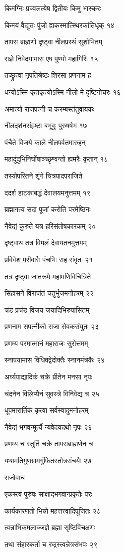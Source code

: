 किमग्निः प्रज्वलत्येष द्वितीयः किमु भास्करः

किमयं वैद्युतः पुंजो ह्यकस्मात्स्थिरकांतिधृक् १४

तापस ब्राह्मणो दृष्ट्वा नीलप्रस्थं सुशोभितम्

राज्ञे निवेदयामास एष पुण्यो महागिरिः १५

तच्छ्रुत्वा नृपतिश्रेष्ठः शिरसा प्रणनाम ह

धन्योऽस्मि कृतकृत्योऽस्मि नीलो मे दृष्टिगोचरः १६

अमात्यो राजपत्नी च करम्बस्तंतुवायकः

नीलदर्शनसंहृष्टा बभूवुः पुरुषर्षभ १७

पंचैते विजये काले नीलपर्वतमारुहन्

महादुंदुभिनिर्घोषाञ्च्छृण्वन्तो ह्यमरैः कृतान् १८

तस्योपरितने शृंगे चित्रपादपराजिते

ददर्श हाटकाबद्धं देवालयमनुत्तमम् १९

ब्रह्मागत्य सदा पूजां करोति परमेष्ठिनः

नैवेद्यं कुरुते यत्र हरिसंतोषकारकम् २०

दृष्ट्वाथ तत्र विमलं देवायतनमुत्तमम्

प्रविवेश परीवारैः पंचभिः सह संवृतः २१

तत्र दृष्ट्वा जातरूपे महामणिविचित्रिते

सिंहासने विराजंतं चतुर्भुजमनोहरम् २२

चंड प्रचंड विजय जयादिभिरुपासितम्

प्रणनाम सपत्नीको राजा सेवकसंयुतः २३

प्रणम्य परमात्मानं महाराजः सुरोत्तमम्

स्नापयामास विधिवद्वेदोक्तैः स्नानमंत्रकैः २४

अर्घ्यपाद्यादिकं चक्रे प्रीतेन मनसा नृपः

चंदनेन विलिप्यैनं सुवस्त्रे विनिवेद्य च २५

धूपमारार्तिकं कृत्वा सर्वस्वादुमनोहरम्

नैवेद्यं भगवन्मूर्त्यै न्यवेदयदथो नृपः २६

प्रणम्य च स्तुतिं चक्रे तापसब्राह्मणेन च

यथामतिगुणग्रामगुंफितस्तोत्रसंचयैः २७

राजोवाच

एकस्त्वं पुरुषः साक्षाद्भगवान्प्रकृतेः परः

कार्यकारणतो भिन्नो महत्तत्त्वादिपूजितः २८

त्वन्नाभिकमलाज्जज्ञे ब्रह्मा सृष्टिविचक्षणः

तथा संहारकर्ता च रुद्रस्त्वन्नेत्रसंभवः २९

